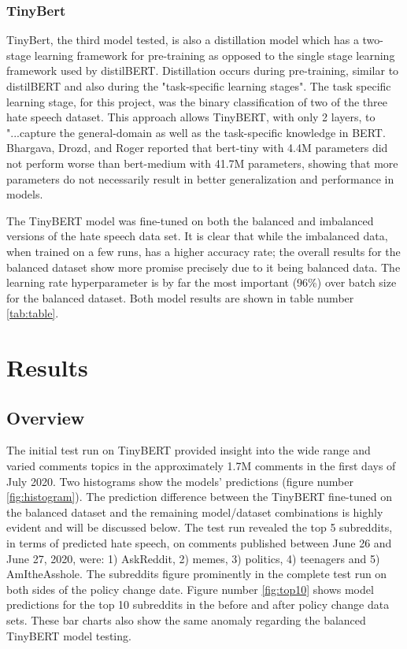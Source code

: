 \documentclass[conference]{IEEEtran}
\begin{document}
\subsubsection{TinyBert}
TinyBert\cite{b21}, the third model tested, is also a distillation model which has a two-stage learning framework for pre-training as opposed to the single stage learning framework used by distilBERT. Distillation occurs during pre-training, similar to distilBERT and also during the "task-specific learning stages"\cite{b22}. The task specific learning stage, for this project, was the binary classification of two of the three hate speech dataset.  This approach allows TinyBERT, with only 2 layers, to "...capture the general-domain as well as the task-specific knowledge in BERT\cite{b21}. Bhargava, Drozd, and Roger\cite{b23} reported that bert-tiny with 4.4M parameters did not perform worse than bert-medium with 41.7M parameters, showing that more parameters do not necessarily result in better generalization and performance in models.

The TinyBERT model was fine-tuned on both the balanced and imbalanced versions of the hate speech data set.  It is clear that while the imbalanced data, when trained on a few runs, has a higher accuracy rate; the overall results for the balanced dataset show more promise precisely due to it being balanced data. The learning rate hyperparameter is by far the most important (96\%) over batch size for the balanced dataset. Both model results are shown in table number \ref{tab:table}.

\section{Results}
\subsection{Overview}
The initial test run on TinyBERT provided insight into the wide range and varied comments topics in the approximately 1.7M comments in the first days of July 2020. Two histograms show the models' predictions (figure number \ref{fig:histogram}). The prediction difference between the TinyBERT fine-tuned on the balanced dataset and the remaining model/dataset combinations is highly evident and will be discussed below. The test run revealed the top 5 subreddits, in terms of predicted hate speech, on comments published between June 26 and June 27, 2020, were: 1) AskReddit, 2) memes, 3) politics, 4) teenagers and 5) AmItheAsshole. The subreddits figure prominently in the complete test run on both sides of the policy change date. Figure number \ref{fig:top10} shows model predictions for the top 10 subreddits in the before and after policy change data sets. These bar charts also show the same anomaly regarding the balanced TinyBERT model testing. 
\end{document}
